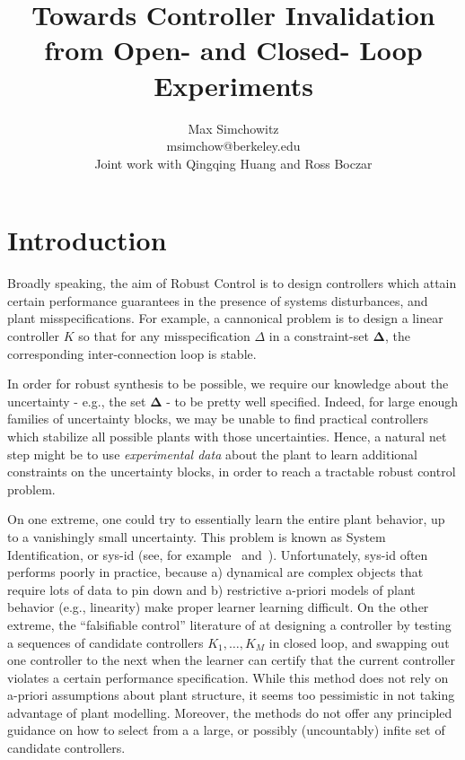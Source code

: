 \documentclass[11pt]{article} %
\title{Towards Controller Invalidation from Open- and Closed- Loop Experiments}
\author{Max Simchowitz\\
msimchow@berkeley.edu\\
Joint work with Qingqing Huang and Ross Boczar}
\theoremstyle{plain}
\theoremstyle{definition}
\theoremstyle{remark}
\begin{document}
\maketitle
\section{Introduction}
Broadly speaking, the aim of Robust Control is to design controllers which attain certain performance guarantees in the presence of systems disturbances, and plant misspecifications. For example, a cannonical problem is to design a linear controller $K$ so that for any misspecification $\Delta$ in a constraint-set $\boldsymbol{\Delta}$, the corresponding inter-connection loop is stable.


In order for robust synthesis to be possible, we require our knowledge about the uncertainty - e.g., the set $\boldsymbol{\Delta}$ -  to be pretty well specified. Indeed, for large enough families of uncertainty blocks, we may be unable to find practical controllers which stabilize all possible plants with those uncertainties. Hence, a natural net step might be to use \emph{experimental data} about the plant to learn additional constraints on the uncertainty blocks, in order to reach a tractable robust control problem.

On one extreme, one could try to essentially learn the entire plant behavior, up to a vanishingly small uncertainty. This problem is known as System Identification, or sys-id (see, for example~\cite{hardt2016gradient} and~\cite{shah2012linear}). Unfortunately, sys-id often performs poorly in practice, because a) dynamical are complex objects that require lots of data to pin down and b) restrictive a-priori models of plant behavior (e.g., linearity) make proper learner learning difficult. On the other extreme, the ``falsifiable control'' literature of \cite{jun1999automatic} at designing a controller by testing a sequences of candidate controllers $K_1,\dots,K_M$ in closed loop, and swapping out one controller to the next when the learner can certify that the current controller violates a certain performance specification. While this method does not rely on a-priori assumptions about plant structure, it seems too pessimistic in not taking advantage of plant modelling. Moreover, the methods do not offer any principled guidance on how to select from a a large, or possibly (uncountably) infite set of candidate controllers.
\end{document}
